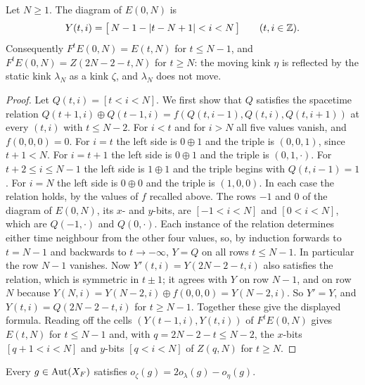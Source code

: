 \begin{lemma}[collision]\label{cl:lem:collision}
Let $N\ge1$. The diagram of $E(0,N)$ is
\[
Y(t,i)=\bigl[\,N-1-|t-N+1|<i<N\,\bigr]\qquad(t,i\in\mathbb{Z}).
\]
Consequently $F^tE(0,N)=E(t,N)$ for $t\le N-1$, and $F^tE(0,N)=Z(2N-2-t,N)$ for $t\ge N$: the moving kink $\eta$ is reflected by the static kink $\lambda_N$ as a kink $\zeta$, and $\lambda_N$ does not move.
\end{lemma}

\begin{proof}
Let $Q(t,i)=[t<i<N]$. We first show that $Q$ satisfies the spacetime relation $Q(t+1,i)\oplus Q(t-1,i)=f(Q(t,i-1),Q(t,i),Q(t,i+1))$ at every $(t,i)$ with $t\le N-2$. For $i<t$ and for $i>N$ all five values vanish, and $f(0,0,0)=0$. For $i=t$ the left side is $0\oplus1$ and the triple is $(0,0,1)$, since $t+1<N$. For $i=t+1$ the left side is $0\oplus1$ and the triple is $(0,1,\cdot)$. For $t+2\le i\le N-1$ the left side is $1\oplus1$ and the triple begins with $Q(t,i-1)=1$. For $i=N$ the left side is $0\oplus0$ and the triple is $(1,0,0)$. In each case the relation holds, by the values of $f$ recalled above. The rows $-1$ and $0$ of the diagram of $E(0,N)$, its $x$- and $y$-bits, are $[-1<i<N]$ and $[0<i<N]$, which are $Q(-1,\cdot)$ and $Q(0,\cdot)$. Each instance of the relation determines either time neighbour from the other four values, so, by induction forwards to $t=N-1$ and backwards to $t\to-\infty$, $Y=Q$ on all rows $t\le N-1$. In particular the row $N-1$ vanishes. Now $Y'(t,i)=Y(2N-2-t,i)$ also satisfies the relation, which is symmetric in $t\pm1$; it agrees with $Y$ on row $N-1$, and on row $N$ because $Y(N,i)=Y(N-2,i)\oplus f(0,0,0)=Y(N-2,i)$. So $Y'=Y$, and $Y(t,i)=Q(2N-2-t,i)$ for $t\ge N-1$. Together these give the displayed formula. Reading off the cells $(Y(t-1,i),Y(t,i))$ of $F^tE(0,N)$ gives $E(t,N)$ for $t\le N-1$ and, with $q=2N-2-t\le N-2$, the $x$-bits $[q+1<i<N]$ and $y$-bits $[q<i<N]$ of $Z(q,N)$ for $t\ge N$.
\end{proof}


\begin{proposition}\label{cl:prop:rel14}
Every $g\in\operatorname{Aut}(X_F)$ satisfies $o_\zeta(g)=2o_\lambda(g)-o_\eta(g)$.
\end{proposition}

